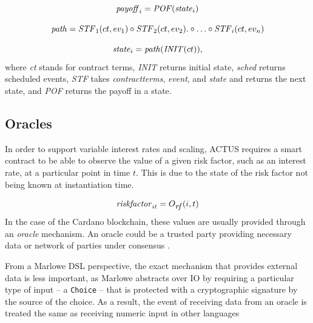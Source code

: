 \documentclass[runningheads]{llncs}
\newcommand{\ident}[1]{\mbox{\emph{#1}}}
\begin{document}
\noindent 
\begin{equation*}
\ident{payoff}_{i}=\ident{POF}(\ident{state}_{i})
\end{equation*}

\newcommand{\STF}{\ident{STF}}
\noindent 
\begin{equation*}
\ident{path}=\STF_{1}(ct,ev_{1})\circ \STF_{2}(ct,ev_{2}).\circ\ldots\circ \STF_{i}(ct,ev_{n})
\end{equation*}

\noindent 
\begin{equation*}
\ident{state}_{i}=\ident{path}(\ident{INIT}(ct)),
\end{equation*}
\noindent
where \emph{ct} stands for contract terms, \emph{INIT} returns initial state, \emph{sched}
returns scheduled events, \emph{STF} takes \emph{contractterms}, \emph{event}, and \emph{state}
and returns the next state, and \emph{POF} returns the payoff in a state.

\subsection{Oracles}

In order to support variable interest rates and scaling, ACTUS requires
a smart contract to be able to observe the value of a given risk factor,
such as an interest rate, at a particular point in time $t$. This is due to the state of the risk factor not being known at instantiation
time. 

\noindent 
\begin{equation*}
\ident{riskfactor}_{it}=O_{\footnotesize\ident{rf}}(i,t)
\end{equation*}
\noindent
In the case of the Cardano blockchain, these values are usually
provided through an \emph{oracle} mechanism\cite{oracles}. An oracle
could be a trusted party providing necessary data or network of parties
under consensus \cite{de-oracles}. 

From a Marlowe DSL perspective,
the exact mechanism that provides external data is less important,
as Marlowe abstracts over IO by requiring a particular type of input -- a 
\texttt{Choice} -- that is protected with a cryptographic signature by the source of the choice.
As a result, the event of receiving data from an oracle is treated the
same as receiving numeric input in other languages
\end{document}
